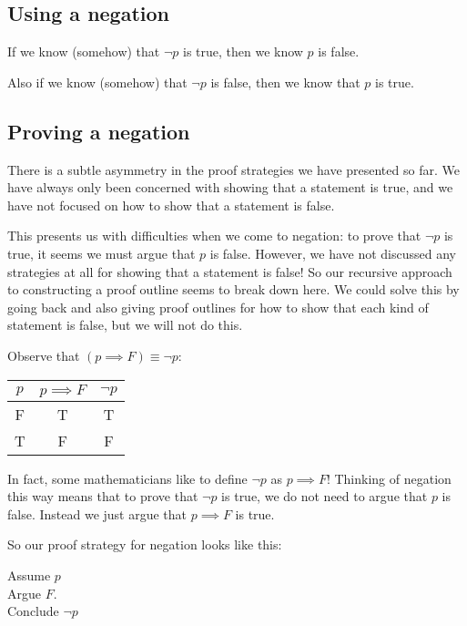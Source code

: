 \documentclass{article}
\begin{document}
\subsection{Using a negation}

If we know (somehow) that $\neg p$ is true, then we know $p$ is false.

Also if we know (somehow) that $\neg p$ is false, then we know that $p$ is true.

\subsection{Proving a negation}

There is a subtle asymmetry in the proof strategies we have presented so far.  We have always only been concerned with showing that a statement is true, and we have not focused on how to show that a statement is false.

This presents us with difficulties when we come to negation:  to prove that $\neg p$ is true, it seems we must argue that $p$ is false.  However, we have not discussed any strategies at all for showing that a statement is false!  So our recursive approach to constructing a proof outline seems to break down here.  We could solve this by going back and also giving proof outlines for how to show that each kind of statement is false, but we will not do this.

Observe that $(p \implies F) \equiv \neg p$:

\begin{table}[h]
	\centering
	\begin{tabular}{c|c|c}
		$p$ & $p \implies F$ & $\neg p$ 	\\ \hline
		F & T & T 	\\ \hline
		T & F & F
	\end{tabular}
\end{table}

In fact, some mathematicians like to define $\neg p$ as $p \implies F$!    Thinking of negation this way means that to prove that $\neg p$ is true, we do not need to argue that $p$ is false.  Instead we just argue that $p \implies F$ is true.

So our proof strategy for negation looks like this:

\begin{fitch*}
	\textrm{Assume $p$}\\
	\fa \textrm{Argue $F$.}\\
	\textrm{Conclude $\neg p$}
	\end{fitch*}
\end{document}
